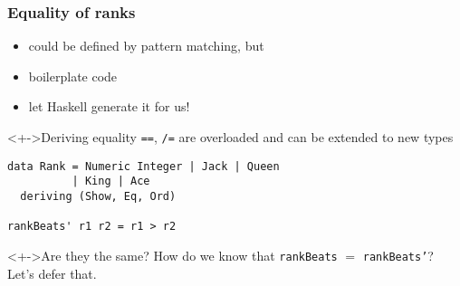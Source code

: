 \documentclass{beamer}
\begin{document}
\begin{frame}[fragile]
  \frametitle{Equality of ranks}
  \begin{itemize}
  \item could be defined by pattern matching, but
  \item boilerplate code
  \item let Haskell generate it for us!
  \end{itemize}
  \begin{block}<+->{Deriving equality}
    \texttt{==}, \texttt{/=} are overloaded and can be extended to
    new types
\begin{verbatim}
data Rank = Numeric Integer | Jack | Queen
          | King | Ace
  deriving (Show, Eq, Ord)

rankBeats' r1 r2 = r1 > r2
\end{verbatim}
  \end{block}
  \begin{block}<+->{Are they the same?}
    How do we know that \texttt{rankBeats} $=$ \texttt{rankBeats'}?
    Let's defer that.

  \end{block}
\end{frame}
\end{document}
